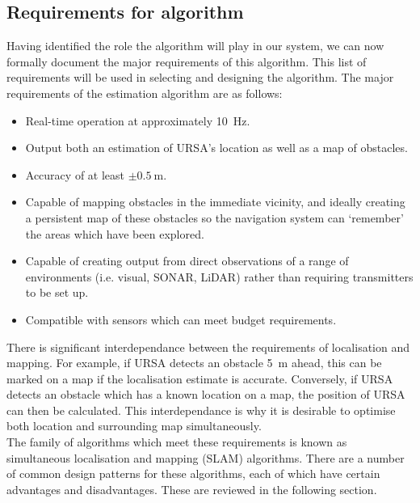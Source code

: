 \documentclass[capstone_report.tex]{subfiles}
\begin{document}
    \subsection{Requirements for algorithm}
    Having identified the role the algorithm will play in our system, we can now formally document the major requirements of this algorithm. This list of requirements will be used in selecting and designing the algorithm. The major requirements of the estimation algorithm are as follows:

    \begin{itemize}
    	\item Real-time operation at approximately \SI{10}{\hertz}.
    	\item Output both an estimation of URSA's location as well as a map of obstacles.
    	\item Accuracy of at least $\pm \SI{0.5}{\meter}$.
    	\item Capable of mapping obstacles in the immediate vicinity, and ideally creating a persistent map of these obstacles so the navigation system can `remember' the areas which have been explored.
    	\item Capable of creating output from direct observations of a range of environments (i.e. visual, SONAR, LiDAR) rather than requiring transmitters to be set up.
    	\item Compatible with sensors which can meet budget requirements.
    \end{itemize}

    There is significant interdependance between the requirements of localisation and mapping. For example, if URSA detects an obstacle \SI{5}{\meter} ahead, this can be marked on a map if the localisation estimate is accurate. Conversely, if URSA detects an obstacle which has a known location on a map, the position of URSA can then be calculated. This interdependance is why it is desirable to optimise both location and surrounding map simultaneously. \\

    The family of algorithms which meet these requirements is known as simultaneous localisation and mapping (SLAM) algorithms. There are a number of common design patterns for these algorithms, each of which have certain advantages and disadvantages. These are reviewed in the following section.
\end{document}
